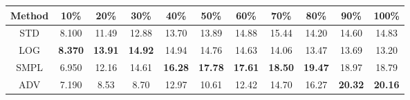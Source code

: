 \documentclass{standalone}
\begin{document}
\begin{tabular}{c|cccccccccc}
      \toprule
      Method & 10\% & 20\% & 30\% & 40\% & 50\% & 60\% & 70\% & 80\% & 90\% & 100\% \\
      \midrule
STD & 8.100 & 11.49 & 12.88 & 13.70 & 13.89 & 14.88 & 15.44 & 14.20 & 14.60 & 14.83\\
LOG & \textbf{8.370} & \textbf{13.91} & \textbf{14.92} & 14.94 & 14.76 & 14.63 & 14.06 & 13.47 & 13.69 & 13.20\\
SMPL & 6.950 & 12.16 & 14.61 & \textbf{16.28} & \textbf{17.78} & \textbf{17.61} & \textbf{18.50} & \textbf{19.47} & 18.97 & 18.79\\
ADV & 7.190 & 8.53 & 8.70 & 12.97 & 10.61 & 12.42 & 14.70 & 16.27 & \textbf{20.32} & \textbf{20.16}\\
  \bottomrule
\end{tabular}
\end{document}
